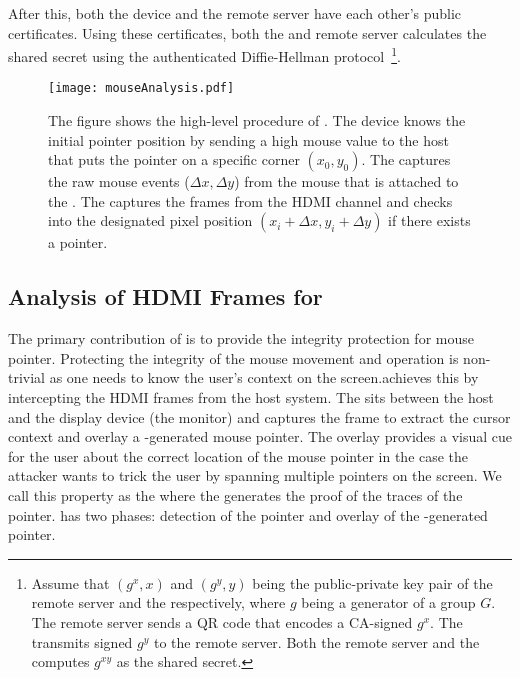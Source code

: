 After this, both the device and the remote server have each other's public certificates. Using these certificates, both the \device and remote server calculates the shared secret using the authenticated Diffie-Hellman protocol~\footnote{Assume that $(g^x, x)$ and $(g^y, y)$ being the public-private key pair of the remote server and the \device respectively, where $g$ being a generator of a group $G$. The remote server sends a QR code that encodes a CA-signed $g^x$. The \device transmits signed $g^y$ to the remote server. Both the remote server and the \device computes $g^{xy}$ as the shared secret.}.



\begin{figure}[t]
\centering
\texttt{[image: mouseAnalysis.pdf]}
\caption{\textbf{\Pop} The figure shows the high-level procedure of \pop. The device knows the initial pointer position by sending a high mouse value to the host that puts the pointer on a specific corner $(x_0, y_0)$. \one The \device captures the raw mouse events ($\Delta x, \Delta y$) from the mouse that is attached to the \device. \two The \device captures the frames from the HDMI channel and checks into the designated pixel position $(x_i + \Delta x, y_i + \Delta y)$ if there exists a pointer.}
\label{fig:mouseAnalysis}
\centering
\end{figure}



\subsection{Analysis of HDMI Frames for \Pop}
\label{sec:systemDesign:analysis}

The primary contribution of \name is to provide the integrity protection for mouse pointer. Protecting the integrity of the mouse movement and operation is non-trivial as one needs to know the user's context on the screen.\name achieves this by intercepting the HDMI frames from the host system. The \device sits between the host and the display device (the monitor) and captures the frame to extract the cursor context and overlay a \device-generated mouse pointer. The overlay provides a visual cue for the user about the correct location of the mouse pointer in the case the attacker wants to trick the user by spanning multiple pointers on the screen. We call this property as the \emph{\pop} where the \device generates the proof of the traces of the pointer. \Pop has two phases: detection of the pointer and overlay of the \device-generated pointer.

